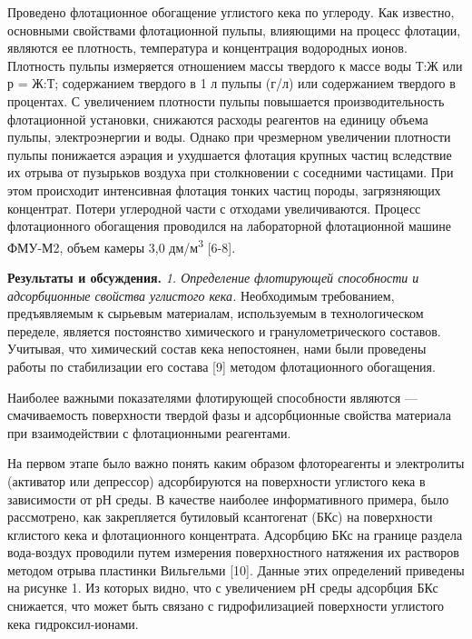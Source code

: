 Проведено флотационное обогащение углистого кека по углероду. Как
известно, основными свойствами флотационной пульпы, влияющими на процесс
флотации, являются ее плотность, температура и концентрация водородных
ионов. Плотность пульпы измеряется отношением массы твердого к массе
воды Т:Ж или р = Ж:Т; содержанием твердого в 1 л пульпы (г/л) или
содержанием твердого в процентах. С увеличением плотности пульпы
повышается производительность флотационной установки, снижаются расходы
реагентов на единицу объема пульпы, электроэнергии и воды. Однако при
чрезмерном увеличении плотности пульпы понижается аэрация и ухудшается
флотация крупных частиц вследствие их отрыва от пузырьков воздуха при
столкновении с соседними частицами. При этом происходит интенсивная
флотация тонких частиц породы, загрязняющих концентрат. Потери
углеродной части с отходами увеличиваются. Процесс флотационного
обогащения проводился на лабораторной флотационной машине ФМУ-М2, объем
камеры 3,0 дм/м\textsuperscript{3} {[}6-8{]}.

\textbf{Результаты и обсуждения.} \emph{1. Определение флотирующей
способности и адсорбционные свойства углистого кека.} Необходимым
требованием, предъявляемым к сырьевым материалам, используемым в
технологическом переделе, является постоянство химического и
гранулометрического составов. Учитывая, что химический состав кека
непостоянен, нами были проведены работы по стабилизации его состава
{[}9{]} методом флотационного обогащения.

Наиболее важными показателями флотирующей способности являются ---
смачиваемость поверхности твердой фазы и адсорбционные свойства
материала при взаимодействии с флотационными реагентами.

На первом этапе было важно понять каким образом флотореагенты и
электролиты (активатор или депрессор) адсорбируются на поверхности
углистого кека в зависимости от рН среды. В качестве наиболее
информативного примера, было рассмотрено, как закрепляется бутиловый
ксантогенат (БКс) на поверхности кглистого кека и флотационного
концентрата. Адсорбцию БКс на границе раздела вода-воздух проводили
путем измерения поверхностного натяжения их растворов методом отрыва
пластинки Вильгельми {[}10{]}. Данные этих определений приведены на
рисунке 1. Из которых видно, что с увеличением рН среды адсорбция БКс
снижается, что может быть связано с гидрофилизацией поверхности
углистого кека гидроксил-ионами.

